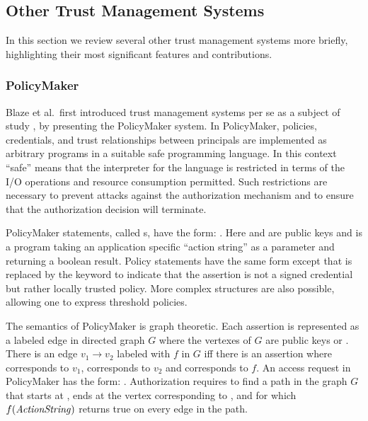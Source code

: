 \subsection{Other Trust Management Systems}
\label{section-other}

In this section we review several other trust management systems more
briefly, highlighting their most significant features and
contributions.

\subsubsection{PolicyMaker}

Blaze et al.~first introduced trust management systems per se as a subject of
study \cite{Blaze:DTM}, by presenting the PolicyMaker system. In PolicyMaker,
policies, credentials, and trust relationships between principals are
implemented as arbitrary programs in a suitable safe programming language. In
this context ``safe'' means that the interpreter for the language is
restricted in terms of the I/O operations and resource consumption permitted.
Such restrictions are necessary to prevent attacks against the authorization
mechanism and to ensure that the authorization decision will terminate.

PolicyMaker statements, called s, have the form:
   
. Here  and  are public
keys and  is a program taking an application specific
``action string'' as a parameter and returning a boolean result. Policy
statements have the same form except that  is replaced by
the keyword  to indicate that the assertion is not a signed
credential but rather locally trusted policy. More complex
 structures are also possible, allowing one to express
threshold policies.

The semantics of PolicyMaker is graph theoretic.  Each assertion is
represented as a labeled edge in directed graph $G$ where the vertexes
of $G$ are public keys or .  There is an edge $v_1
\rightarrow v_2$ labeled with $f$ in $G$ iff there is an assertion
where  corresponds to $v_1$,
 corresponds to $v_2$ and 
corresponds to $f$. An access request in PolicyMaker has the form:
  . Authorization
requires to find a path in the graph $G$ that starts at ,
ends at the vertex corresponding to , and for which
$f(\text{\textit{ActionString}})$ returns true on every edge in the path.

